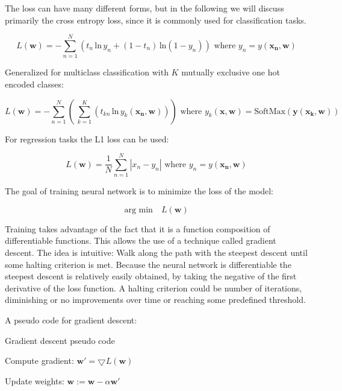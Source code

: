\documentclass[draft,final,oneside]{vutinfth} %
\begin{document}
The loss can have many different forms, but in the following we will discuss primarily the cross entropy loss, since it is commonly used for classification tasks.

\begin{equation}
L(\boldsymbol{w}) = -\sum_{n=1}^N \left( t_n\,\text{ln}\, y_n + (1 - t_n)\,\text{ln}(1 - y_n)\right) \text{ where } 
y_n = y(\boldsymbol{x_n}, \boldsymbol{w})
\end{equation}

Generalized for multiclass classification with $K$ mutually exclusive one hot encoded classes:

\begin{equation}
L(\boldsymbol{w}) = -\sum_{n=1}^N \left(\,\sum_{k=1}^K \left(t_{kn}\,\text{ln}\,y_k(\boldsymbol{x_n},\boldsymbol{w})\right)\right) \text{ where } y_k(\boldsymbol{x}, \boldsymbol{w}) = \text{SoftMax}(\boldsymbol{y}(\boldsymbol{x_k}, \boldsymbol{w}))
\end{equation}

For regression tasks the L1 loss can be used:

\begin{equation}
L(\boldsymbol{w}) = \dfrac{1}{N} \sum_{n=1}^N |x_n - y_n| \text{ where } 
y_n = y(\boldsymbol{x_n}, \boldsymbol{w})
\end{equation}

The goal of training neural network is to minimize the loss of the model:

\begin{equation}
\text{arg min}\quad L(\boldsymbol{w})
\end{equation}

Training takes advantage of the fact that it is a function composition of differentiable functions. This allows the use of a technique called gradient descent. The idea is intuitive: Walk along the path with the steepest descent until some halting criterion is met. Because the neural network is differentiable the steepest descent is relatively easily obtained, by taking the negative of the first derivative of the loss function. A halting criterion could be number of iterations, diminishing or no improvements over time or reaching some predefined threshold.

A pseudo code for gradient descent:

\begin{algorithm}
\caption{Gradient descent pseudo code}\label{gradientedescentalgo}
 {
Compute gradient: $\boldsymbol{w}' = \bigtriangledown	L(\boldsymbol{w})$

Update weights: $\boldsymbol{w} := \boldsymbol{w} - \alpha \boldsymbol{w}'$
}

\end{algorithm}
\end{document}
